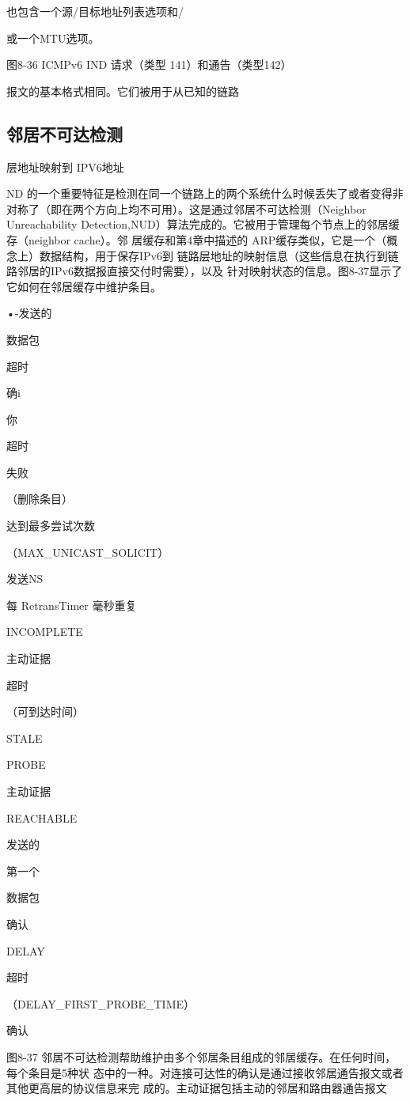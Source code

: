 也包含一个源/目标地址列表选项和/

或一个MTU选项。

图8-36 ICMPv6 IND 请求（类型 141）和通告（类型142）

报文的基本格式相同。它们被用于从已知的链路

\subsection{邻居不可达检测}
层地址映射到 IPV6地址

ND 的一个重要特征是检测在同一个链路上的两个系统什么时候丢失了或者变得非
对称了（即在两个方向上均不可用）。这是通过邻居不可达检测（Neighbor Unreachability
Detection,NUD）算法完成的。它被用于管理每个节点上的邻居缓存（neighbor cache）。邻
居缓存和第4章中描述的 ARP缓存类似，它是一个（概念上）数据结构，用于保存IPv6到
链路层地址的映射信息（这些信息在执行到链路邻居的IPv6数据报直接交付时需要），以及
针对映射状态的信息。图8-37显示了它如何在邻居缓存中维护条目。

•-发送的

数据包

超时

确i

你

超时

失败

（删除条目）

达到最多尝试次数

（MAX\_UNICAST\_SOLICIT）

发送NS

每 RetransTimer 毫秒重复

INCOMPLETE

主动证据

超时

（可到达时间）

STALE

PROBE

主动证据

REACHABLE

发送的

第一个

数据包

确认

DELAY

超时

（DELAY\_FIRST\_PROBE\_TIME）

确认

图8-37 邻居不可达检测帮助维护由多个邻居条目组成的邻居缓存。在任何时间，每个条目是5种状
态中的一种。对连接可达性的确认是通过接收邻居通告报文或者其他更高层的协议信息来完
成的。主动证据包括主动的邻居和路由器通告报文

